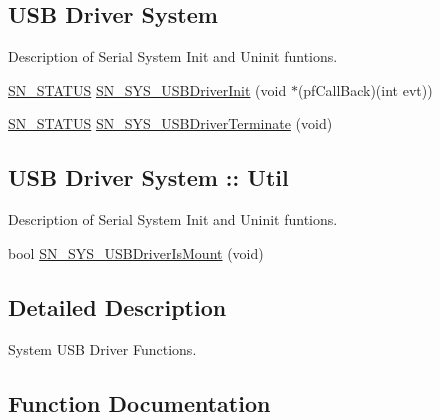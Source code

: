 \subsection*{U\+SB Driver System}
\label{_amgrp520fea60abf54d62f341eebb2a0145c6}%
Description of Serial System Init and Uninit funtions. \begin{DoxyCompactItemize}
\item 
\hyperlink{group__SYSTEM__ERROR_ga4540713b9a7a18ce44d78c3a10f7442f}{S\+N\+\_\+\+S\+T\+A\+T\+US} \hyperlink{group__SYSTEM__USB__DRIVER_gaf7719b8e9f6d6f05b702ac7d4e9c5a61}{S\+N\+\_\+\+S\+Y\+S\+\_\+\+U\+S\+B\+Driver\+Init} (void $\ast$(pf\+Call\+Back)(int evt))
\item 
\hyperlink{group__SYSTEM__ERROR_ga4540713b9a7a18ce44d78c3a10f7442f}{S\+N\+\_\+\+S\+T\+A\+T\+US} \hyperlink{group__SYSTEM__USB__DRIVER_ga60bc7a83a5370d89dffe6e3d4ad88538}{S\+N\+\_\+\+S\+Y\+S\+\_\+\+U\+S\+B\+Driver\+Terminate} (void)
\end{DoxyCompactItemize}
\subsection*{U\+SB Driver System \+:\+: Util}
\label{_amgrp0bffd34c90f12d85c8fa16d1d16b13fd}%
Description of Serial System Init and Uninit funtions. \begin{DoxyCompactItemize}
\item 
bool \hyperlink{group__SYSTEM__USB__DRIVER_gaccafd3f2c96104a41f768f05a083226f}{S\+N\+\_\+\+S\+Y\+S\+\_\+\+U\+S\+B\+Driver\+Is\+Mount} (void)
\end{DoxyCompactItemize}


\subsection{Detailed Description}
System U\+SB Driver Functions. 



\subsection{Function Documentation}
\mbox{\label{group__SYSTEM__USB__DRIVER_gaf7719b8e9f6d6f05b702ac7d4e9c5a61}} 
